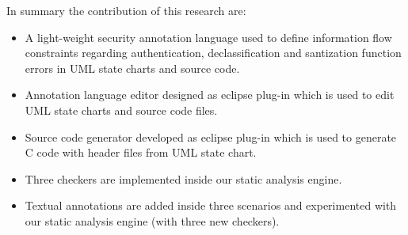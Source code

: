 In summary the contribution of this research are:
\begin{itemize}
 \item A light-weight security annotation language
	used to define information flow constraints regarding authentication, declassification and santization function errors in UML state charts and source code.
	
\item Annotation language editor designed as eclipse
	plug-in which is used to edit UML state charts and
	source code files.
	
\item Source code generator developed as eclipse plug-in which is used to generate C code with header files from UML state chart.

\item Three checkers are implemented inside our static analysis engine.
	
\item Textual annotations are added inside three scenarios and experimented with our static analysis engine (with three new checkers).

\end{itemize}

 


